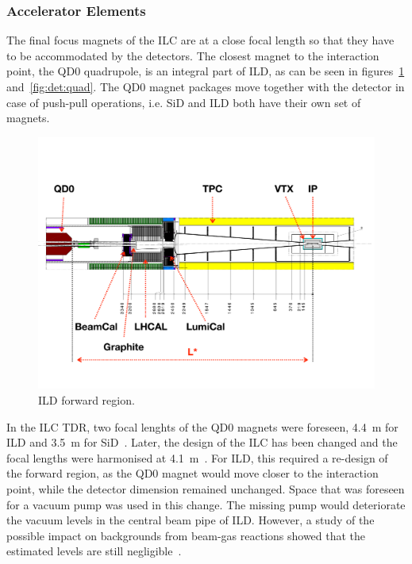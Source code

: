 \subsubsection{Accelerator Elements}
The final focus magnets of the ILC are at a close focal length so that they have to be accommodated by the detectors. The closest magnet to the interaction point, the QD0 quadrupole, is an integral part of ILD, as can be seen in figures~\ref{ild:fig:Forward_QD0} and~\ref{fig:det:quad}. The QD0 magnet packages move together with the detector in case of push-pull operations, i.e. SiD and ILD both have their own set of magnets.
\begin{figure}[h!]
\centering
\includegraphics[width=0.8\hsize]{ILC/figs/ILD_Forward_Region.pdf}
\caption{\label{ild:fig:Forward_QD0}ILD forward region.}
\end{figure}
In the ILC TDR, two focal lenghts of the QD0 magnets were foreseen, 4.4~m for ILD and 3.5~m for SiD~\cite{Behnke:2013xla}. Later, the design of the ILC has been changed and the focal lengths were harmonised at 4.1~m~\cite{ild:bib:lstar_cr}. For ILD, this required a re-design of the forward region, as the QD0 magnet would move closer to the interaction point, while the detector dimension remained unchanged. Space that was foreseen for a vacuum pump was used in this change. The missing pump would deteriorate the vacuum levels in the central beam pipe of ILD. However, a study of the possible impact on backgrounds from beam-gas reactions showed that the estimated levels are still negligible~\cite{ild:bib:beam_gas}.
